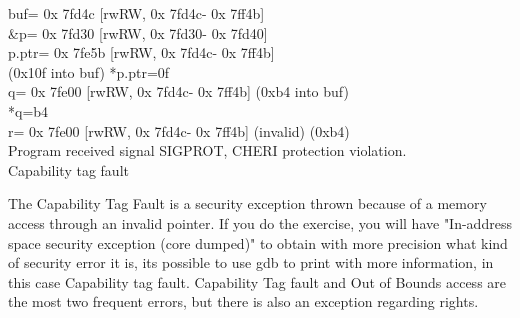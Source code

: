 \documentclass[a4paper, 11pt]{article}
\newcommand{\ptraddress}[1]{%
    0x\textcolor{gray}{\scalebox{0.9}{fffffff}}#1%
}
\begin{document}
\begin{tcolorbox}[colback=gray!5!white, colframe=blue!75!black, title=Output on an environment protected by CHERI]
buf=\ptraddress{}7fd4c [rwRW, \ptraddress{}7fd4c-\ptraddress{}7ff4b]\\
\&p=\ptraddress{}7fd30 [rwRW,\ptraddress{}7fd30-\ptraddress{}7fd40]\\
p.ptr=\ptraddress{}7fe5b [rwRW,\ptraddress{}7fd4c-\ptraddress{}7ff4b]\\
 (0x10f into buf) *p.ptr=0f\\
q=\ptraddress{}7fe00 [rwRW, \ptraddress{}7fd4c-\ptraddress{}7ff4b] (0xb4 into buf)\\
*q=b4\\
r=\ptraddress{}7fe00 [rwRW, \ptraddress{}7fd4c-\ptraddress{}7ff4b] (invalid) (0xb4)\\
Program received signal SIGPROT, CHERI protection violation.\\
Capability tag fault
\end{tcolorbox}
The Capability Tag Fault is a security exception thrown because of a memory access through an invalid pointer. If you do the exercise, you will have "In-address space security exception (core dumped)" to obtain with more precision what kind of security error it is, its possible to use \Gls{gdb} to print with more information, in this case Capability tag fault. Capability Tag fault and Out of Bounds access are the most two frequent errors, but there is also an exception regarding rights. 
\end{document}

